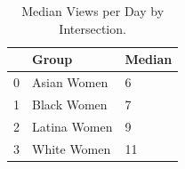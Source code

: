 \begin{table}[htbp]
\centering
\caption{Median Views per Day by Intersection.}
\label{tab:eda_views_per_day_by_group}
\begin{tabular}{lll}
\toprule
 & Group & Median \\
\midrule
0 & Asian Women & 6 \\
1 & Black Women & 7 \\
2 & Latina Women & 9 \\
3 & White Women & 11 \\
\bottomrule
\end{tabular}

\end{table}